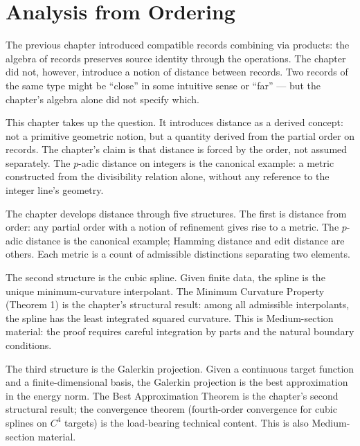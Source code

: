 \chapter{Analysis from Ordering}
\label{chap:analysis-from-ordering}


\begin{chapteressay}

The previous chapter introduced compatible records combining via
products: the algebra of records preserves source identity through
the operations. The chapter did not, however, introduce a notion of
distance between records. Two records of the same type might be
``close'' in some intuitive sense or ``far'' --- but the chapter's
algebra alone did not specify which.

This chapter takes up the question. It introduces distance as a
derived concept: not a primitive geometric notion, but a quantity
derived from the partial order on records. The chapter's claim is
that distance is forced by the order, not assumed separately. The
$p$-adic distance on integers is the canonical example: a metric
constructed from the divisibility relation alone, without any
reference to the integer line's geometry.

The chapter develops distance through five structures. The first is
distance from order: any partial order with a notion of refinement
gives rise to a metric. The $p$-adic distance is the canonical
example; Hamming distance and edit distance are others. Each metric
is a count of admissible distinctions separating two elements.

The second structure is the cubic spline. Given finite data, the
spline is the unique minimum-curvature interpolant. The Minimum
Curvature Property (Theorem 1) is the chapter's structural
result: among all admissible interpolants, the spline has the least
integrated squared curvature. This is Medium-section material: the
proof requires careful integration by parts and the natural
boundary conditions.

The third structure is the Galerkin projection. Given a continuous
target function and a finite-dimensional basis, the Galerkin
projection is the best approximation in the energy norm. The Best
Approximation Theorem is the chapter's second structural result;
the convergence theorem (fourth-order convergence for cubic
splines on $C^4$ targets) is the load-bearing technical content.
This is also Medium-section material.


\end{chapteressay}
